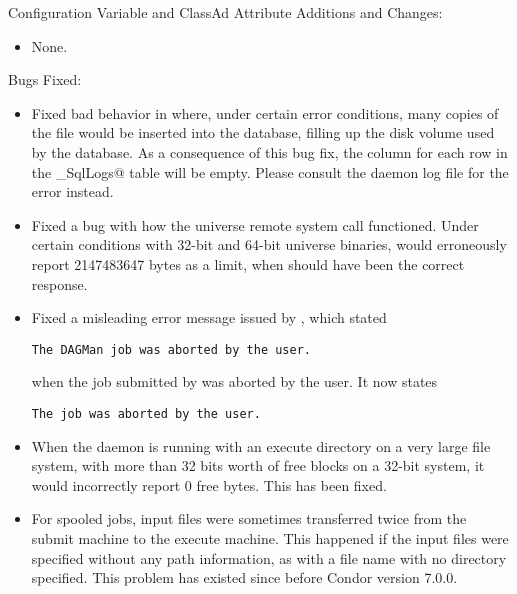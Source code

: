 \noindent Configuration Variable and ClassAd Attribute Additions and Changes:

\begin{itemize}

\item None.

\end{itemize}

\noindent Bugs Fixed:

\begin{itemize}

\item Fixed bad behavior in  where, under certain error
conditions, many copies of the  file would be
inserted into the database, filling up the disk volume used by the
database. As a consequence of this bug fix, the \verb@LogBody@ column
for each row in the \verb@Error_SqlLogs@ table will be empty. Please
consult the  daemon log file for the error instead.

\item Fixed a bug with how the  universe 
remote system call  functioned.
Under certain conditions with
32-bit and 64-bit  universe binaries,
 would erroneously report 2147483647 bytes as a limit,
when  should have been the correct response.

\item Fixed a misleading error message issued by ,
which stated
\begin{verbatim}
The DAGMan job was aborted by the user.
\end{verbatim}
when the job submitted by  was aborted by the user.
It now states 
\begin{verbatim}
The job was aborted by the user.
\end{verbatim}

\item When the  daemon is running with an execute directory on
a very large file system, with more than 32 bits worth of free blocks
on a 32-bit system, it would incorrectly report 0 free bytes.  This
has been fixed.

\item For spooled jobs, input files were sometimes transferred twice from
the submit machine to the execute machine.  This happened if the input files
were specified without any path information,
as with a file name with no directory specified.
This problem has existed since before Condor version 7.0.0.


\end{itemize}
